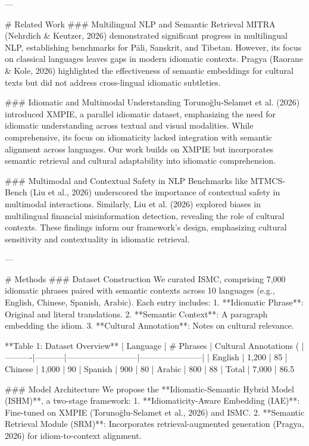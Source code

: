 ---

# Related Work  
### Multilingual NLP and Semantic Retrieval  
MITRA (Nehrdich & Keutzer, 2026) demonstrated significant progress in multilingual NLP, establishing benchmarks for Pāli, Sanskrit, and Tibetan. However, its focus on classical languages leaves gaps in modern idiomatic contexts. Pragya (Raorane & Kole, 2026) highlighted the effectiveness of semantic embeddings for cultural texts but did not address cross-lingual idiomatic subtleties.  

### Idiomatic and Multimodal Understanding  
Torunoğlu-Selamet et al. (2026) introduced XMPIE, a parallel idiomatic dataset, emphasizing the need for idiomatic understanding across textual and visual modalities. While comprehensive, its focus on idiomaticity lacked integration with semantic alignment across languages. Our work builds on XMPIE but incorporates semantic retrieval and cultural adaptability into idiomatic comprehension.

### Multimodal and Contextual Safety in NLP  
Benchmarks like MTMCS-Bench (Liu et al., 2026) underscored the importance of contextual safety in multimodal interactions. Similarly, Liu et al. (2026) explored biases in multilingual financial misinformation detection, revealing the role of cultural contexts. These findings inform our framework's design, emphasizing cultural sensitivity and contextuality in idiomatic retrieval.

---

# Methods  
### Dataset Construction  
We curated ISMC, comprising 7,000 idiomatic phrases paired with semantic contexts across 10 languages (e.g., English, Chinese, Spanish, Arabic). Each entry includes:
1. **Idiomatic Phrase**: Original and literal translations.
2. **Semantic Context**: A paragraph embedding the idiom.
3. **Cultural Annotation**: Notes on cultural relevance.

**Table 1: Dataset Overview**  
| Language | # Phrases | Cultural Annotations (%
|----------|-----------|--------------------------|-----------------------|  
| English  | 1,200     | 85%
| Chinese  | 1,000     | 90%
| Spanish  | 900       | 80%
| Arabic   | 800       | 88%
| Total    | 7,000     | 86.5%

### Model Architecture  
We propose the **Idiomatic-Semantic Hybrid Model (ISHM)**, a two-stage framework:  
1. **Idiomaticity-Aware Embedding (IAE)**: Fine-tuned on XMPIE (Torunoğlu-Selamet et al., 2026) and ISMC.  
2. **Semantic Retrieval Module (SRM)**: Incorporates retrieval-augmented generation (Pragya, 2026) for idiom-to-context alignment.  

